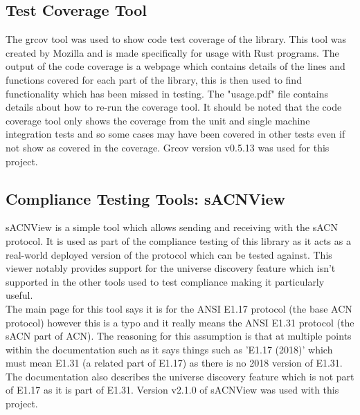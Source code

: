 \documentclass[11pt,a4paper]{article}
\begin{document}
\subsection{Test Coverage Tool}
The grcov \cite{GRCOV} tool was used to show code test coverage of the library. This tool was created by Mozilla and is made specifically for usage with Rust programs. The output of the code coverage is a webpage which contains details of the lines and functions covered for each part of the library, this is then used to find functionality which has been missed in testing. The "usage.pdf" file contains details about how to re-run the coverage tool. It should be noted that the code coverage tool only shows the coverage from the unit and single machine integration tests and so some cases may have been covered in other tests even if not show as covered in the coverage. Grcov version v0.5.13 was used for this project.

\subsection{Compliance Testing Tools: sACNView}
sACNView \cite{SACN_VIEW} is a simple tool which allows sending and receiving with the sACN protocol. It is used as part of the compliance testing of this library as it acts as a real-world deployed version of the protocol which can be tested against. This viewer notably provides support for the universe discovery feature which isn't supported in the other tools used to test compliance making it particularly useful.\\

The main page for this tool says it is for the ANSI E1.17 \cite{ANSI_E1.17} protocol (the base ACN protocol) however this is a typo and it really means the ANSI E1.31 protocol (the sACN part of ACN). The reasoning for this assumption is that at multiple points within the documentation such as \cite{SACN_VIEWER_DOC} it says things such as 'E1.17 (2018)' which must mean E1.31 (a related part of E1.17) as there is no 2018 version of E1.31. The documentation also describes the universe discovery feature which is not part of E1.17 as it is part of E1.31. Version v2.1.0 of sACNView was used with this project. \\
\end{document}

